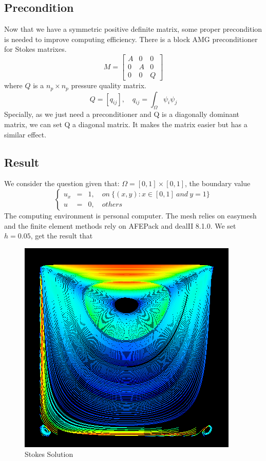 \documentclass[a4paper]{article}
\begin{document}
\subsection{Precondition}
Now that we have a symmetric positive definite matrix, some proper precondition is needed to improve computing efficiency. There is a block AMG preconditioner for Stokes matrixes.
\begin{equation}
M = \left[ \begin{array}{ccc}
A & 0 & 0 \\
0 & A & 0 \\
0 & 0 & Q
\end{array}
\right]
\end{equation}
where $Q$ is a $n_p\times n_p$ pressure quality matrix.
\begin{equation}
Q = [q_{ij}], \quad q_{ij} = \int_{\Omega} \psi_i\psi_j
\label{pr::Q}
\end{equation}
Specially, as we just need a preconditioner and Q is a diagonally dominant matrix, we can set Q a diagonal matrix. It makes the matrix easier but has a similar effect.
\subsection{Result}
We consider the question given that: $\Omega = [0,1]\times[0,1]$, the boundary value
\begin{equation}
\left\lbrace
\begin{array}{rcl}
u_x &=& 1,\quad on \ \{(x,y): x \in [0,1] \ and \ y = 1\}\\
u &=& 0,\quad others
\end{array}
\right.
\label{bd::value1}
\end{equation}
The computing environment is personal computer. The mesh relies on easymesh and the finite element methods rely on AFEPack and dealII 8.1.0. We set $h=0.05$, get the result that

\begin{figure}[h]
\centering
\includegraphics[scale = 0.4]{Stokes.png}
\caption{Stokes Solution}
\label{im::Stokes-Solution}
\end{figure}
\end{document}
